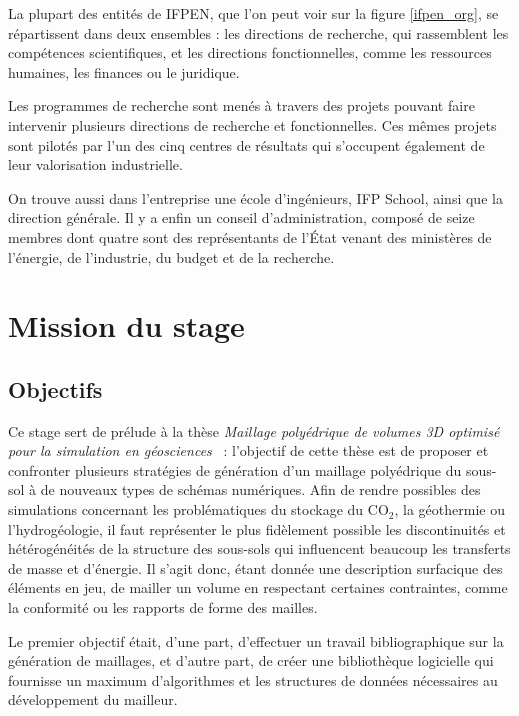 \documentclass[12pt,a4paper]{report}
\begin{document}
La plupart des entités de IFPEN, que l'on peut voir sur la figure \ref{ifpen_org}, se répartissent dans deux ensembles : les directions de recherche, qui rassemblent les compétences scientifiques, et les directions fonctionnelles, comme les ressources humaines, les finances ou le juridique.

Les programmes de recherche sont menés à travers des projets pouvant faire intervenir plusieurs directions de recherche et fonctionnelles. Ces mêmes projets sont pilotés par l'un des cinq centres de résultats qui s'occupent également de leur valorisation industrielle.

On trouve aussi dans l'entreprise une école d'ingénieurs, IFP School, ainsi que la direction générale. Il y a enfin un conseil d'administration, composé de seize membres dont quatre sont des représentants de l'\'Etat venant des ministères de l'énergie, de l'industrie, du budget et de la recherche.

\newpage
\section{Mission du stage}

\subsection{Objectifs}

Ce stage sert de prélude à la thèse \og \emph{Maillage polyédrique de volumes 3D optimisé pour la simulation en géosciences} \fg{}~: l'objectif de cette thèse est de proposer et confronter plusieurs stratégies de génération d'un maillage polyédrique du sous-sol à de nouveaux types de schémas numériques. Afin de rendre possibles des simulations concernant les problématiques du stockage du CO$_2$, la géothermie ou l'hydrogéologie, il faut représenter le plus fidèlement possible les discontinuités et hétérogénéités de la structure des sous-sols qui influencent beaucoup les transferts de masse et d'énergie. Il s'agit donc, étant donnée une description surfacique des éléments en jeu, de mailler un volume en respectant certaines contraintes, comme la conformité ou les rapports de forme des mailles.

Le premier objectif était, d'une part, d'effectuer un travail bibliographique sur la génération de maillages, et d'autre part, de créer une bibliothèque logicielle qui fournisse un maximum d'algorithmes et les structures de données nécessaires au développement du mailleur.
\end{document}
